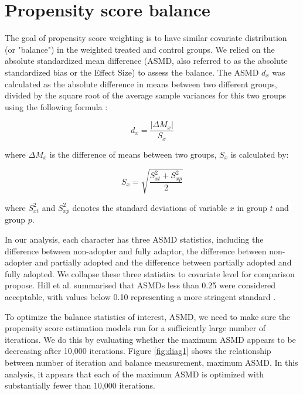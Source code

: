 \documentclass[12pt]{report}
\begin{document}
\chapter{Propensity score balance}
The goal of propensity score weighting is to have similar covariate distribution (or "balance") in the weighted treated and control groups. We relied on the absolute standardized mean difference (ASMD, also referred to as the absolute standardized bias or the Effect Size) to assess the balance. The ASMD $d_x$ was calculated as the absolute difference in means between two different groups, divided by the square root of the average sample variances for this two groups using the following formula \citep{haviland2007combining}:

\begin{equation*}
d_x =\frac{|\Delta M_x|}{S_x}
\end{equation*}

where $\Delta M_x$ is the difference of means between two groups, $S_x$ is calculated by: 

\begin{equation*}
S_x=\sqrt{\frac{S^2_{xt}+S^2_{xp}}{2}}
\end{equation*}

where $S^2_{xt}$ and $S^2_{xp}$ denotes the standard deviations of variable $x$ in group $t$ and group $p$.

In our analysis, each character has three ASMD statistics, including the difference between non-adopter and fully adaptor, the difference between non-adopter and partially adopted and the difference between partially adopted and fully adopted. We collapse these three statistics to covariate level for comparison propose. Hill et al. summarised that ASMDs less than 0.25 were considered acceptable, with values below 0.10 representing a more stringent standard \citep{hillm2015short}.

To optimize the balance statistics of interest, ASMD, we need to make sure the propensity score estimation models run for a sufficiently large number of iterations. We do this by evaluating whether the maximum ASMD appears to be decreasing after 10,000 iterations. Figure \ref{fig:diag1} shows the relationship between number of iteration and balance measurement, maximum ASMD. In this analysis, it appears that each of the maximum ASMD is optimized with substantially fewer than 10,000 iterations.
\end{document}
